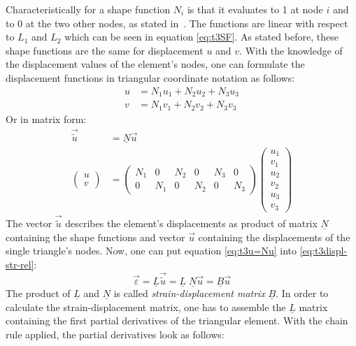   Characteristically for a shape function $N_i$ is that it evaluates to 1 at node $i$ and to 0 at the two other nodes, as stated in~\cite{steinke2005finite}. The functions are linear with respect to $L_1$ and $L_2$ which can be seen in equation \eqref{eq:t3SF}. As stated before, these shape functions are the same for displacement $u$ and $v$. With the knowledge of the displacement values of the element's nodes, one can formulate the displacement functions in triangular coordinate notation as follows:
  \begin{align}
  u &= N_1 u_1 + N_2 u_2 + N_3 u_3 \nonumber\\
  v &= N_1 v_1 + N_2 v_2 + N_3 v_3
  \end{align}
  Or in matrix form:
  \begin{align} \label{eq:t3u=Nu}
  \vec{\tilde{u}} &= \underline{N} \vec{u} \nonumber\\
  \begin{pmatrix}
  u \\ v
  \end{pmatrix} &= \begin{pmatrix}
  N_1 & 0 & N_2 & 0 & N_3 & 0 \\
  0 & N_1 & 0 & N_2 & 0 & N_3
  \end{pmatrix} \begin{pmatrix}
  u_1 \\ v_1 \\ u_2 \\ v_2 \\ u_3 \\ v_3
  \end{pmatrix}
  \end{align}
  The vector $\vec{\tilde{u}}$ describes the element's displacements as product of matrix $\underline{N}$ containing the shape functions and vector $\vec{u}$ containing the displacements of the single triangle's nodes. Now, one can put equation \eqref{eq:t3u=Nu} into \eqref{eq:t3displ-str-rel}:
  \begin{equation}\label{eq:t3eps=Bu}
  \vec{\varepsilon} = \underline{L}\vec{\tilde{u}} = \underline{L}\;\underline{N} \vec{u} = \underline{B} \vec{u}
  \end{equation}
  The product of $\underline{L}$ and $\underline{N}$ is called \textit{strain-displacement matrix} $\underline{B}$.
  In order to calculate the strain-displacement matrix, one has to assemble the $\underline{L}$ matrix containing the first partial derivatives of the triangular element. With the chain rule applied, the partial derivatives look as follows:
